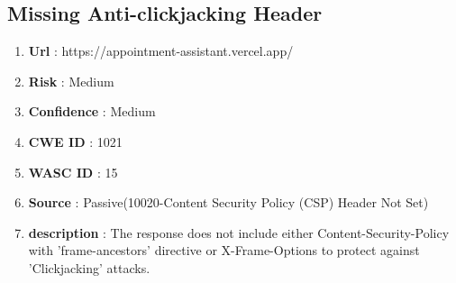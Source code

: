 \documentclass[openany]{report}
\begin{document}
\subsection{Missing Anti-clickjacking Header}
\begin{enumerate}
    \item \textbf{Url} : https://appointment-assistant.vercel.app/
    \item \textbf{Risk} : Medium
    \item \textbf{Confidence} : Medium
    \item \textbf{CWE ID} : 1021
    \item \textbf{WASC ID} : 15
    \item \textbf{Source} : Passive(10020-Content Security Policy (CSP) Header Not Set)
    \item \textbf{description} : The response does not include either Content-Security-Policy with 'frame-ancestors' directive or X-Frame-Options to protect against 'Clickjacking' attacks.


\end{enumerate}
\end{document}
